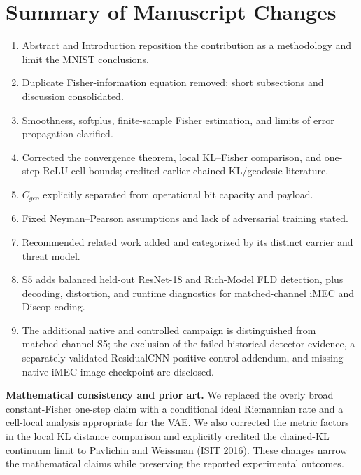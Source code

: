 \documentclass[12pt,a4paper]{article}
\begin{document}
\section*{Summary of Manuscript Changes}
\begin{enumerate}[leftmargin=2em]
  \item Abstract and Introduction reposition the contribution as a methodology and limit the MNIST conclusions.
  \item Duplicate Fisher-information equation removed; short subsections and discussion consolidated.
  \item Smoothness, softplus, finite-sample Fisher estimation, and limits of error propagation clarified.
  \item Corrected the convergence theorem, local KL--Fisher comparison, and one-step ReLU-cell bounds; credited earlier chained-KL/geodesic literature.
  \item $C_{geo}$ explicitly separated from operational bit capacity and payload.
  \item Fixed Neyman--Pearson assumptions and lack of adversarial training stated.
  \item Recommended related work added and categorized by its distinct carrier and threat model.
  \item S5 adds balanced held-out ResNet-18 and Rich-Model FLD detection, plus decoding, distortion, and runtime diagnostics for matched-channel iMEC and Discop coding.
  \item The additional native and controlled campaign is distinguished from matched-channel S5; the exclusion of the failed historical detector evidence, a separately validated ResidualCNN positive-control addendum, and missing native iMEC image checkpoint are disclosed.
\end{enumerate}

\bigskip
\par\noindent\textbf{Mathematical consistency and prior art.}
We replaced the overly broad constant-Fisher one-step claim with a
conditional ideal Riemannian rate and a cell-local analysis appropriate
for the VAE. We also corrected the metric factors in the local KL
distance comparison and explicitly credited the chained-KL continuum
limit to Pavlichin and Weissman (ISIT 2016). These changes narrow the
mathematical claims while preserving the reported experimental outcomes.
\end{document}
